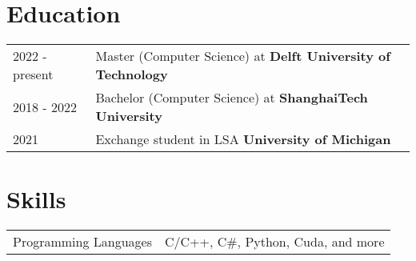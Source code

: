 \documentclass[a4paper,12pt]{article}
\begin{document}
\section{Education}
\begin{tabularx}{\linewidth}{@{}l X@{}}	
2022 - present & Master (Computer Science) at \textbf{Delft University of Technology} \hfill \normalsize 
\\

2018 - 2022 & Bachelor (Computer Science) at \textbf{ShanghaiTech University} \hfill 
\\ 

2021  & Exchange student in LSA \textbf{University of Michigan} \hfill
\\

\end{tabularx}


\section{Skills}
\begin{tabularx}{\linewidth}{@{}l X@{}}
Programming Languages &  \normalsize{C/C++, C\#, Python, Cuda, and more}\\
\end{tabularx}

\vfill
{}
\end{document}
